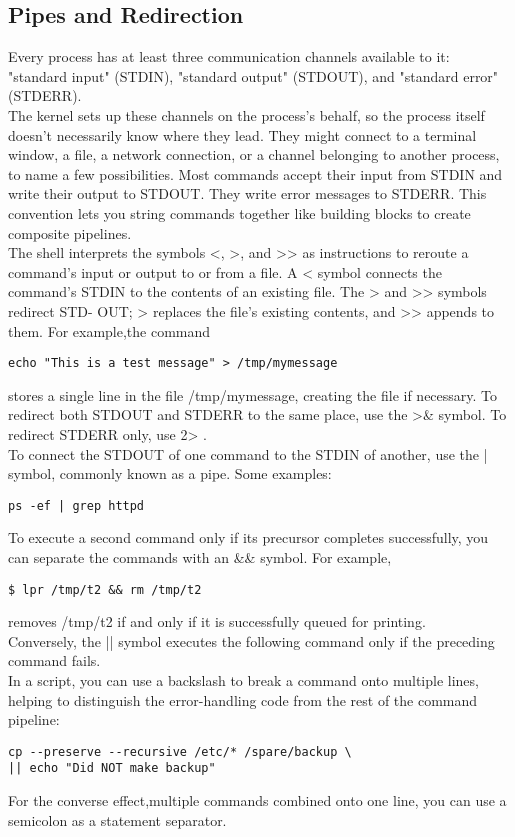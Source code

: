 \documentclass[10pt,letterpaper]{book}
\begin{document}
\subsection{Pipes and Redirection}
Every process has at least three communication channels available to it: "standard input" (STDIN), "standard output" (STDOUT), and "standard error" (STDERR).\\
The kernel sets up these channels on the process's behalf, so the process itself
doesn't necessarily know where they lead. They might connect to a terminal window, a file, a network connection, or a channel belonging to another process, to
name a few possibilities.
Most commands accept their input from STDIN and write their output to STDOUT. They write error messages to STDERR. This convention lets you string
commands together like building blocks to create composite pipelines.\\
The shell interprets the symbols <, >, and >> as instructions to reroute a command's input or output to or from a file. A < symbol connects the command's
STDIN to the contents of an existing file. The > and >> symbols redirect STD-
OUT; > replaces the file's existing contents, and >> appends to them. For example,the command
\begin{lstlisting}
echo "This is a test message" > /tmp/mymessage
\end{lstlisting}
stores a single line in the file /tmp/mymessage, creating the file if necessary.
To redirect both STDOUT and STDERR to the same place, use the >\& symbol. To redirect STDERR only, use 2> .\\
To connect the STDOUT of one command to the STDIN of another, use the | symbol, commonly known as a pipe. Some examples:
\begin{lstlisting}
ps -ef | grep httpd
\end{lstlisting}
To execute a second command only if its precursor completes successfully, you can separate the commands with an \&\& symbol. For example,
\begin{lstlisting}
$ lpr /tmp/t2 && rm /tmp/t2
\end{lstlisting}
removes /tmp/t2 if and only if it is successfully queued for printing.\\
Conversely, the || symbol executes the following command only if the preceding
command fails.\\
In a script, you can use a backslash to break a command onto multiple lines, helping to distinguish the error-handling code from the rest of the command pipeline:
\begin{lstlisting}
cp --preserve --recursive /etc/* /spare/backup \
|| echo "Did NOT make backup"
\end{lstlisting}
For the converse effect,multiple commands combined onto one line, you can
use a semicolon as a statement separator.
\end{document}
